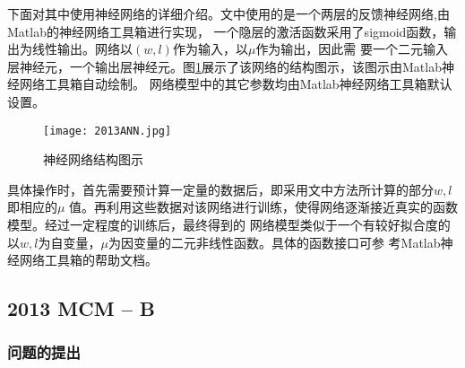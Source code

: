 \documentclass[bwprint]{cumcmthesis}
\begin{document}
下面对其中使用神经网络的详细介绍。文中使用的是一个两层的反馈神经网络,由Matlab的神经网络工具箱进行实现，
一个隐层的激活函数采用了sigmoid函数，输出为线性输出。网络以$(w,l)$作为输入，以$\mu$作为输出，因此需
要一个二元输入层神经元，一个输出层神经元。图\ref{2013ann}展示了该网络的结构图示，该图示由Matlab神经网络工具箱自动绘制。
网络模型中的其它参数均由Matlab神经网络工具箱默认设置。

\begin{figure}[!h]
	\centering
	\texttt{[image: 2013ANN.jpg]}
	\caption{神经网络结构图示}
	\label{2013ann}
\end{figure}

具体操作时，首先需要预计算一定量的数据后，即采用文中方法所计算的部分$w,l$即相应的$\mu$
值。再利用这些数据对该网络进行训练，使得网络逐渐接近真实的函数模型。经过一定程度的训练后，最终得到的
网络模型类似于一个有较好拟合度的以$w,l$为自变量，$\mu$为因变量的二元非线性函数。具体的函数接口可参
考Matlab神经网络工具箱的帮助文档。

\subsection{2013 MCM -- B}

\subsubsection{问题的提出}
\end{document}
